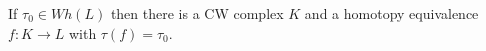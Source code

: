 If $\tau_0 \in Wh(L)$ then there is a CW complex $K$ and a homotopy equivalence $f: K \rightarrow L$ with $\tau(f) = \tau_0$.
